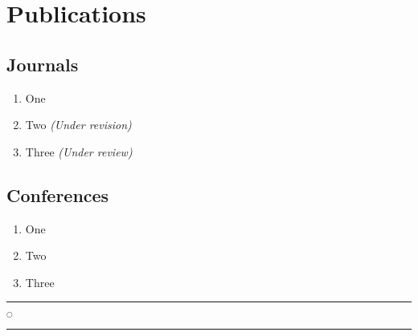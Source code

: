 \chapter*{Publications}
\section*{Journals}

\begin{enumerate}
	
	\item One
	\item Two	\textit{(Under revision)}
	\item Three \textit{(Under review)}

\end{enumerate}

\section*{Conferences}


\begin{enumerate}

	\item One
	\item Two 
	\item Three

\end{enumerate}


\noindent
\rule{0.49\textwidth}{0.75pt} $_{\bigcirc}$ \rule{0.49\textwidth}{0.75pt}\\







